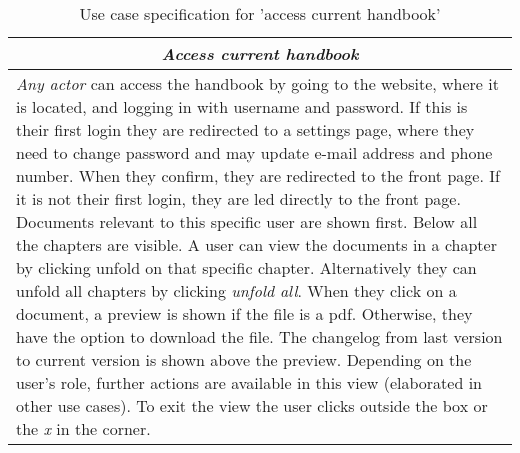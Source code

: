 \begin{table}
\centering
\begin{tabular}{p{14.5cm}}
\hline
\multicolumn{1}{c}{\textit{\textbf{Access current handbook}}} \\
\hline
\textit{Any actor} can access the handbook by going to the website, where it is located, and logging in with username and password.
If this is their first login they are redirected to a settings page, where they need to change password and may update e-mail address and phone number.
When they confirm, they are redirected to the front page.
If it is not their first login, they are led directly to the front page.
Documents relevant to this specific user are shown first.
Below all the chapters are visible.
A user can view the documents in a chapter by clicking unfold on that specific chapter.
Alternatively they can unfold all chapters by clicking \textit{unfold all}.
When they click on a document, a preview is shown if the file is a pdf.
Otherwise, they have the option to download the file.
The changelog from last version to current version is shown above the preview.
Depending on the user's role, further actions are available in this view (elaborated in other use cases).
To exit the view the user clicks outside the box or the \textit{x} in the corner.
\\\hline
\end{tabular}
\caption{Use case specification for 'access current handbook'}\label{tab:access-handbook}
\end{table}
